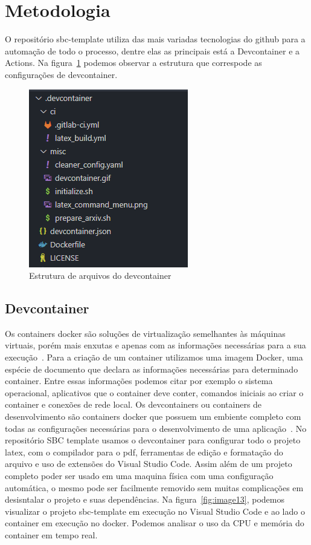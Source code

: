 \section{Metodologia}

O repositório sbc-template utiliza das mais variadas tecnologias do github para a automação de todo o processo, dentre elas as principais está a Devcontainer e a Actions. Na figura~\ref{fig:image12} podemos observar a estrutura que correspode as configurações de devcontainer.

\begin{figure}[ht]
	\centering
	\includegraphics[width=.5\textwidth]{./images/image12.png}
	\caption{Estrutura de arquivos do devcontainer}
	\label{fig:image12}
\end{figure}


\subsection{Devcontainer}
Os containers docker são soluções de virtualização semelhantes às máquinas virtuais, porém mais enxutas e apenas com as informações necessárias para a sua execução~\cite{vitalino:01}. Para a criação de um container utilizamos uma imagem Docker, uma espécie de documento que declara as informações necessárias para determinado container. Entre essas informações podemos citar por exemplo o sistema operacional, aplicativos que o container deve conter, comandos iniciais ao criar o container e conexões de rede local.
Os devcontainers ou containers de desenvolvimento são containers docker que possuem um embiente completo com todas as configurações necessárias para o desenvolvimento de uma aplicação~\cite{github:01}. No repositório SBC template usamos o devcontainer para configurar todo o projeto latex, com o compilador para o pdf, ferramentas de edição e formatação do arquivo e uso de extensões do Visual Studio Code. Assim além de um projeto completo poder ser usado em uma maquina física com uma configuração automática, o mesmo pode ser facilmente removido sem muitas complicações em desisntalar o projeto e suas dependências.
Na figura~\ref{fig:image13}, podemos visualizar o projeto sbc-template em execução no Visual Studio Code e ao lado o container em execução no docker. Podemos analisar o uso da CPU e memória do container em tempo real.

